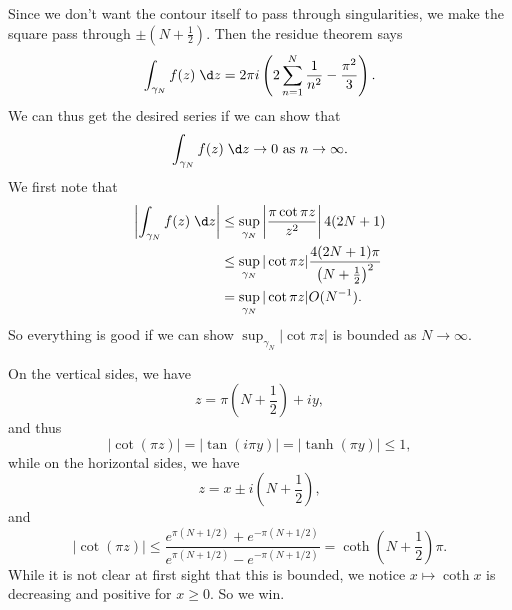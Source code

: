 \documentclass[a4paper]{article}
\begin{document}
\begin{eg}
\begin{center}
  \end{center}
  Since we don't want the contour itself to pass through singularities, we make the square pass through $\pm\left(N + \frac{1}{2}\right)$. Then the residue theorem says
  \[
    \int_{\gamma_N}f(z) \;\d z = 2\pi i\left(2 \sum_{n = 1}^N \frac{1}{n^2} - \frac{\pi^2}{3}\right).
  \]
  We can thus get the desired series if we can show that
  \[
    \int_{\gamma_N} f(z)\;\d z \to 0\text{ as }n\to \infty.
  \]
  We first note that
  \begin{align*}
    \left|\int_{\gamma_N} f(z)\;\d z \right| &\leq \sup_{\gamma_N} \left|\frac{\pi \cot \pi z}{z^2}\right| 4(2N + 1)\\
    &\leq \sup_{\gamma_N} |\cot \pi z| \frac{4(2N + 1)\pi}{\left(N + \frac{1}{2}\right)^2}\\
    &= \sup_{\gamma_N} |\cot \pi z| O(N^{-1}).
  \end{align*}
  So everything is good if we can show $\sup_{\gamma_N} |\cot \pi z|$ is bounded as $N \to \infty$.

  On the vertical sides, we have
  \[
    z = \pi \left(N + \frac{1}{2}\right) + iy,
  \]
  and thus
  \[
    |\cot (\pi z)| = |\tan(i \pi y)| = |\tanh (\pi y)| \leq 1,
  \]
  while on the horizontal sides, we have
  \[
    z = x \pm i\left(N + \frac{1}{2}\right),
  \]
  and
  \[
    |\cot (\pi z)| \leq \frac{e^{\pi(N + 1/2)} + e^{-\pi(N + 1/2)}}{e^{\pi(N + 1/2)} - e^{-\pi(N + 1/2)}} = \coth\left(N + \frac{1}{2}\right)\pi.
  \]
  While it is not clear at first sight that this is bounded, we notice $x \mapsto \coth x$ is decreasing and positive for $x \geq 0$. So we win.
\end{eg}
\end{document}
